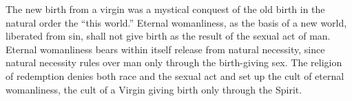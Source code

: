 \begin{quotationx}
The new birth from a virgin was a mystical conquest of the old birth in the natural order the ``this world.'' Eternal womanliness, as the basis of a new world, liberated from sin, shall not give birth as the result of the sexual act of man. Eternal womanliness bears within itself release from natural necessity, since natural necessity rules over man only through the birth-giving sex. The religion of redemption denies both race and the sexual act and set up the cult of eternal womanliness, the cult of a Virgin giving birth only through the Spirit.

\end{quotationx}


